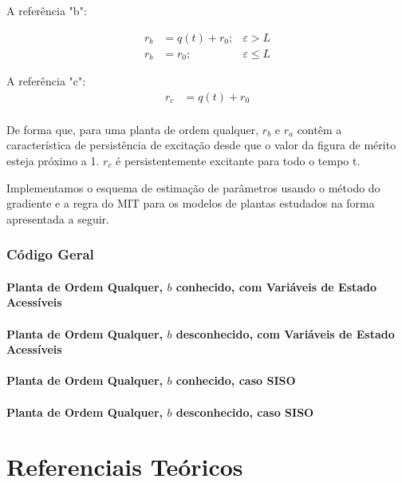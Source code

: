 \documentclass[
	12pt,				%
	openright,			%
	twoside,			%
	a4paper,			%
	english,			%
	french,				%
	spanish,			%
	brazil				%
	]{abntex2}
\begin{document}
 A referência "b":
  
  \begin{align*}
      r_b &= q(t) + r_0 ; & \varepsilon > L  \\
      r_b &= r_0 ; & \varepsilon \leq L
  \end{align*}
  
 A referência "c": \begin{align*}
     r_c &= q(t) + r_0  \\
   \end{align*}  
  
  De forma que, para uma planta de ordem qualquer, $r_b$ e $r_a$ contêm a característica de persistência de excitação desde que o valor da figura de mérito esteja próximo a 1. $r_c$ é persistentemente excitante para todo o tempo t.  
  
  Implementamos o esquema de estimação de parâmetros usando o método do gradiente e a regra do MIT para os modelos de plantas estudados na forma apresentada a seguir.

\section{Código Geral}
\subsection{Planta de Ordem Qualquer, $b$ conhecido,    com Variáveis de Estado Acessíveis}
\subsection{Planta de Ordem Qualquer, $b$ desconhecido, com Variáveis de Estado Acessíveis}
\subsection{Planta de Ordem Qualquer, $b$ conhecido,    caso SISO}
\subsection{Planta de Ordem Qualquer, $b$ desconhecido, caso SISO}


\part{Referenciais Teóricos}
\end{document}
